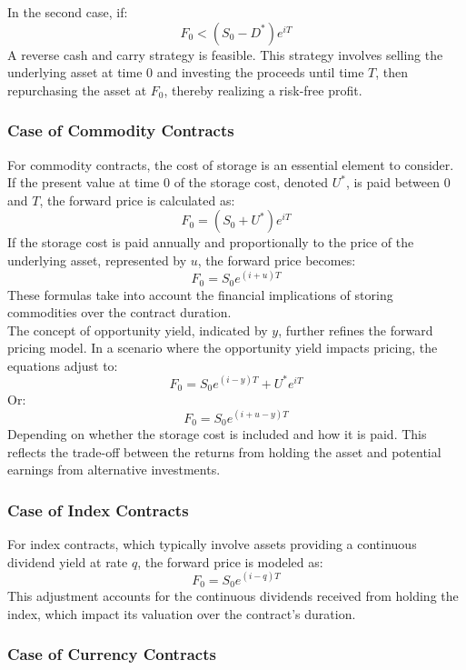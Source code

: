 \documentclass[a4paper,10pt]{article}
\begin{document}
            \noindent In the second case, if: \[F_0<(S_0 - D^*) e^{iT}\] A reverse cash and carry strategy is feasible. This strategy involves selling the underlying asset at time 0 and investing the proceeds until time \(T\), then repurchasing the asset at \(F_0\), thereby realizing a risk-free profit. \\
            
        \subsubsection*{Case of Commodity Contracts}
        
            \noindent For commodity contracts, the cost of storage is an essential element to consider. If the present value at time 0 of the storage cost, denoted \(U^*\), is paid between 0 and \(T\), the forward price is calculated as: \[F_0 = (S_0 + U^*) e^{iT}\] If the storage cost is paid annually and proportionally to the price of the underlying asset, represented by \(u\), the forward price becomes: \[F_0 = S_0 e^{(i+u)T}\] These formulas take into account the financial implications of storing commodities over the contract duration. \\

            \noindent The concept of opportunity yield, indicated by \(y\), further refines the forward pricing model. In a scenario where the opportunity yield impacts pricing, the equations adjust to: \[F_0 = S_0 e^{(i-y)T} + U^* e^{iT}\] Or: \[F_0 = S_0 e^{(i+u-y)T}\] Depending on whether the storage cost is included and how it is paid. This reflects the trade-off between the returns from holding the asset and potential earnings from alternative investments. \\
        
        \subsubsection*{Case of Index Contracts}
        
            \noindent For index contracts, which typically involve assets providing a continuous dividend yield at rate \(q\), the forward price is modeled as: \[F_0 = S_0 e^{(i-q)T}\] This adjustment accounts for the continuous dividends received from holding the index, which impact its valuation over the contract's duration. \\
        
        \subsubsection*{Case of Currency Contracts}
            
\end{document}
